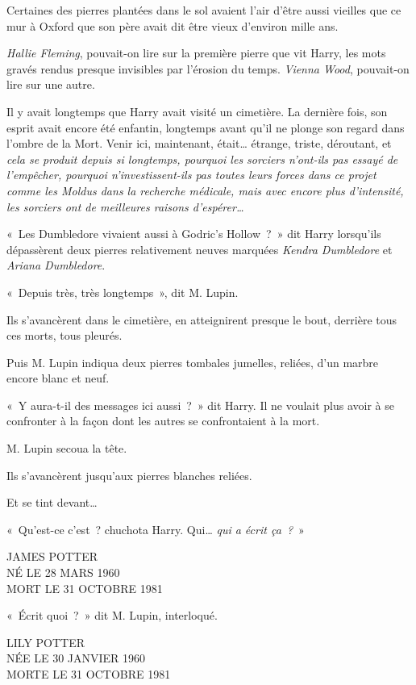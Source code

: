 Certaines des pierres plantées dans le sol avaient l'air d'être aussi vieilles que ce mur à Oxford que son père avait dit être vieux d'environ mille ans.

\emph{Hallie Fleming}, pouvait-on lire sur la première pierre que vit Harry, les mots gravés rendus presque invisibles par l'érosion du temps.
\emph{Vienna Wood}, pouvait-on lire sur une autre.

Il y avait longtemps que Harry avait visité un cimetière.
La dernière fois, son esprit avait encore été enfantin, longtemps avant qu'il ne plonge son regard dans l'ombre de la Mort.
Venir ici, maintenant, était… étrange, triste, déroutant, et \emph{cela se produit depuis si longtemps, pourquoi les sorciers n'ont-ils pas essayé de l'empêcher, pourquoi n'investissent-ils pas toutes leurs forces dans ce projet comme les Moldus dans la recherche médicale, mais avec encore plus d'intensité, les sorciers ont de meilleures raisons d'espérer…}

«~Les Dumbledore vivaient aussi à Godric's Hollow~?~»
dit Harry lorsqu'ils dépassèrent deux pierres relativement neuves marquées \emph{Kendra Dumbledore} et \emph{Ariana Dumbledore}.

«~Depuis très, très longtemps~», dit M. Lupin.

Ils s'avancèrent dans le cimetière, en atteignirent presque le bout, derrière tous ces morts, tous pleurés.

Puis M. Lupin indiqua deux pierres tombales jumelles, reliées, d'un marbre encore blanc et neuf.

«~Y aura-t-il des messages ici aussi~?~»
dit Harry.
Il ne voulait plus avoir à se confronter à la façon dont les autres se confrontaient à la mort.

M. Lupin secoua la tête.

Ils s'avancèrent jusqu'aux pierres blanches reliées.

Et se tint devant…

«~Qu'est-ce c'est~? chuchota Harry.
Qui… \emph{qui a écrit ça~?}~»
\begin{center}
JAMES POTTER\\
NÉ LE 28 MARS 1960\\
MORT LE 31 OCTOBRE 1981
\end{center}

«~Écrit quoi~?~»
dit M. Lupin, interloqué.

\begin{center}
LILY POTTER\\
NÉE LE 30 JANVIER 1960\\
MORTE LE 31 OCTOBRE 1981
\end{center}

